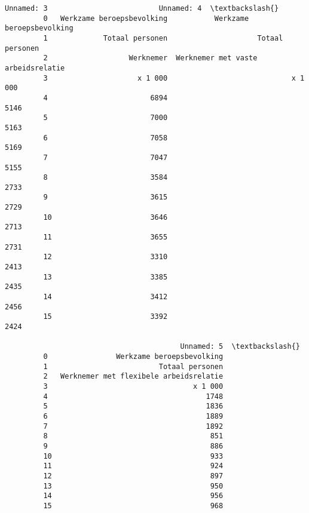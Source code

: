 \documentclass[11pt]{article}
\begin{document}
\begin{Verbatim}[commandchars=\\\{\}]
                            Unnamed: 3                          Unnamed: 4  \textbackslash{}
         0   Werkzame beroepsbevolking           Werkzame beroepsbevolking   
         1             Totaal personen                     Totaal personen   
         2                   Werknemer  Werknemer met vaste arbeidsrelatie   
         3                     x 1 000                             x 1 000   
         4                        6894                                5146   
         5                        7000                                5163   
         6                        7058                                5169   
         7                        7047                                5155   
         8                        3584                                2733   
         9                        3615                                2729   
         10                       3646                                2713   
         11                       3655                                2731   
         12                       3310                                2413   
         13                       3385                                2435   
         14                       3412                                2456   
         15                       3392                                2424   
         
                                         Unnamed: 5  \textbackslash{}
         0                Werkzame beroepsbevolking   
         1                          Totaal personen   
         2   Werknemer met flexibele arbeidsrelatie   
         3                                  x 1 000   
         4                                     1748   
         5                                     1836   
         6                                     1889   
         7                                     1892   
         8                                      851   
         9                                      886   
         10                                     933   
         11                                     924   
         12                                     897   
         13                                     950   
         14                                     956   
         15                                     968   
         

\end{Verbatim}
\end{document}
